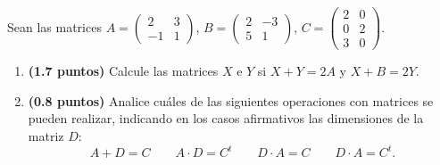 
Sean las matrices $A=\begin{pmatrix}2&3\\-1&1\end{pmatrix}$, $B=\begin{pmatrix}2&-3\\5&1\end{pmatrix}$, $C=\begin{pmatrix}2&0\\0&2\\3&0\end{pmatrix}$.
\begin{enumerate}[label=\alph*)]
\item \textbf{(1.7 puntos)} Calcule las matrices $X$ e $Y$ si $X+Y=2A$ y $X+B=2Y$.
\item \textbf{(0.8 puntos)} Analice cuáles de las siguientes operaciones con matrices se pueden realizar, indicando en los casos afirmativos las dimensiones de la matriz $D$:
\[
A+D=C\qquad A\cdot D=C^t\qquad D\cdot A=C\qquad D\cdot A=C^t.
\]
\end{enumerate}
